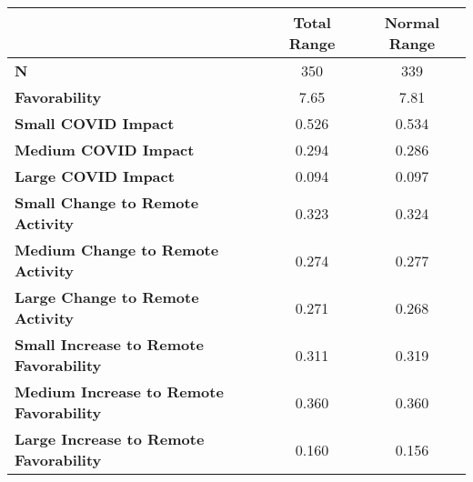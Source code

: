 {
\def\sym#1{\ifmmode^{#1}\else\(^{#1}\)\fi}
\begin{tabular}{lcc}
    \toprule
                                                    & \textbf{Total Range} & \textbf{Normal Range}          \\
    \midrule
    \textbf{N}                                      & 350                  & 339                            \\
    \textbf{Favorability}                           & 7.65                 & 7.81                           \\
    \textbf{Small COVID Impact}                     & 0.526                & 0.534                          \\
    \textbf{Medium COVID Impact}                    & 0.294                & 0.286                          \\
    \textbf{Large COVID Impact}                     & 0.094                & 0.097                          \\
    \textbf{Small Change to Remote Activity}        & 0.323                & 0.324                          \\
    \textbf{Medium Change to Remote Activity}       & 0.274                & 0.277                          \\
    \textbf{Large Change to Remote Activity}        & 0.271                & 0.268                          \\
    \textbf{Small Increase to Remote Favorability}  & 0.311                & 0.319                          \\
    \textbf{Medium Increase to Remote Favorability} & 0.360                & 0.360                          \\
    \textbf{Large Increase to Remote Favorability}  & 0.160                & 0.156                          \\
    \bottomrule
\end{tabular}
}
